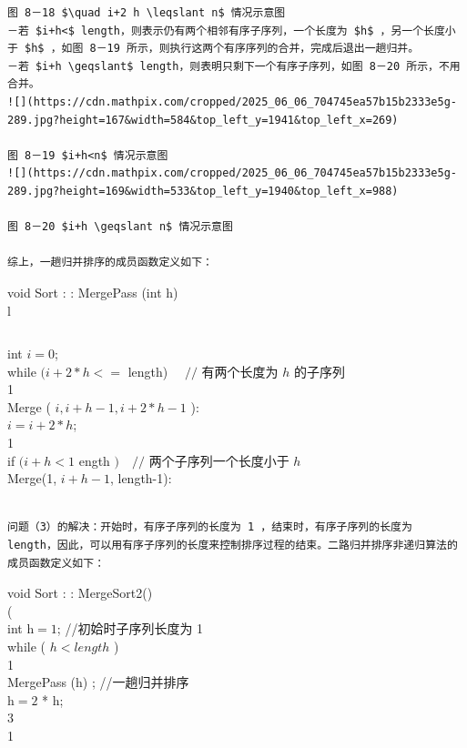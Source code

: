 \documentclass[10pt]{article}
\begin{document}
\begin{verbatim}
图 8－18 $\quad i+2 h \leqslant n$ 情况示意图
－若 $i+h<$ length，则表示仍有两个相邻有序子序列，一个长度为 $h$ ，另一个长度小于 $h$ ，如图 8－19 所示，则执行这两个有序序列的合并，完成后退出一趟归并。
－若 $i+h \geqslant$ length，则表明只剩下一个有序子序列，如图 8－20 所示，不用合并。
![](https://cdn.mathpix.com/cropped/2025_06_06_704745ea57b15b2333e5g-289.jpg?height=167&width=584&top_left_y=1941&top_left_x=269)

图 8－19 $i+h<n$ 情况示意图
![](https://cdn.mathpix.com/cropped/2025_06_06_704745ea57b15b2333e5g-289.jpg?height=169&width=533&top_left_y=1940&top_left_x=988)

图 8－20 $i+h \geqslant n$ 情况示意图

综上，一趟归并排序的成员函数定义如下：
\end{verbatim}

void Sort : : MergePass (int h)\\
l

\begin{verbatim}

\end{verbatim}

int $i=0$;\\
while $(i+2 * h<=$ length) $\quad / /$ 有两个长度为 $h$ 的子序列\\
1\\
Merge ( $i, i+h-1, i+2 * h-1$ ):\\
$i=i+2 * h$;\\
1\\
if $(i+h<1$ ength $) \quad / /$ 两个子序列一个长度小于 $h$\\
Merge(1, $i+h-1$, length-1):

\begin{verbatim}

问题（3）的解决：开始时，有序子序列的长度为 1 ，结束时，有序子序列的长度为 length，因此，可以用有序子序列的长度来控制排序过程的结束。二路归并排序非递归算法的成员函数定义如下：
\end{verbatim}

void Sort : : MergeSort2()\\
(\\
int $\mathrm{h}=1$; //初姶时子序列长度为 1\\
while ( $h<l e n g t h$ )\\
1\\
MergePass (h) ; //一趟归并排序\\
$\mathrm{h}=2$ * h;\\
3\\
1
\end{document}
